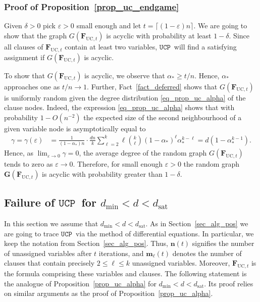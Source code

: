 \documentclass[10pt,reqno]{amsart}
\numberwithin{equation}{section}
\renewcommand{\vec}[1]{\boldsymbol{#1}}
\newcommand\dmin{d_{\mathrm{min}}}
\newcommand\dsat{d_{\mathrm{sat}}}
\newcommand{\FUC}[1]{\PHI_{\mathrm{UC},{#1}}}
\newcommand{\UCP}{\ensuremath{\mathtt{UCP}}}
\newcommand\G{\vec G}
\newcommand\PHI{\vec F}
\newcommand\vm{\vec m}
\newcommand\vn{\vec n}
\newcommand\eps{\varepsilon}
\newcommand\Prop{Proposition}
\newcommand\Sec{Section}
\begin{document}
	
	


\subsubsection{Proof of \Prop~\ref{prop_uc_endgame}}\label{sec_prop_uc_endgame}
Given $\delta>0$ pick $\eps>0$ small enough and let $t=\lceil(1-\eps)n\rceil$.
We are going to show that the graph $G(\FUC t)$ is acyclic with probability at least $1-\delta$.
Since all clauses of $\FUC t$ contain at least two variables, \UCP\ will find a satisfying assignment if $G(\FUC t)$ is acyclic.

To show that $G(\FUC t)$ is acyclic, we observe that $\alpha_*\geq t/n$.
Hence, $\alpha_*$ approaches one as $t/n\to1$.
Further, Fact~\ref{fact_deferred} shows that $G(\FUC t)$ is uniformly random given the degree distribution \eqref{eq_prop_uc_alpha} of the clause nodes.
Indeed, the expression \eqref{eq_prop_uc_alpha} shows that with probability $1-O(n^{-2})$ the expected size of the second neighbourhood of a given variable node is asymptotically equal to
	\begin{align*}
		\gamma=\gamma(\eps)&=\frac1{(1-\alpha_*)n}\cdot\frac{dn}{k}\sum_{\ell=2}^k\ell\binom k\ell(1-\alpha_*)^\ell\alpha_*^{k-\ell}=d(1-\alpha_*^{k-1}).
	\end{align*}
Hence, as $\lim_{\eps\to 0}\gamma=0$, the average degree of the random graph $G(\FUC t)$ tends to zero as $\eps\to0$.
Therefore, for small enough $\eps>0$ the random graph $\G(\FUC t)$ is acyclic with probability greater than $1-\delta$.



\subsection{Failure of \UCP\ for $\dmin<d<\dsat$}\label{sec_failure}
In this section we assume that $\dmin<d<\dsat$.
As in \Sec~\ref{sec_alg_pos} we are going to trace \UCP\ via the method of differential equations.
In particular, we keep the notation from \Sec~\ref{sec_alg_pos}.
Thus, $\vn(t)$ signifies the number of unassigned variables after $t$ iterations, and $\vm_\ell(t)$ denotes the number of clauses that contain precisely $2\leq\ell\leq k$ unassigned variables.
Moreover, $\FUC t$ is the formula comprising these variables and clauses.
The following statement is the analogue of \Prop~\ref{prop_uc_alpha} for $\dmin<d<\dsat$.
Its proof relies on similar arguments as the proof of \Prop~\ref{prop_uc_alpha}.
\end{document}
